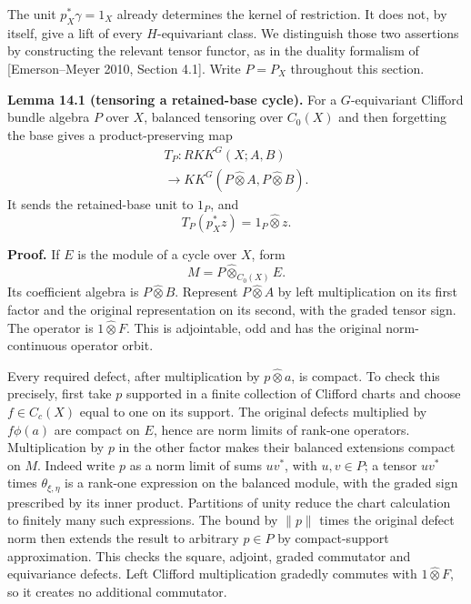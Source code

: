 \documentclass[
  11pt,
]{article}
\begin{document}
The unit \(p_X^*\gamma=1_X\) already determines the kernel of
restriction. It does not, by itself, give a lift of every
\(H\)-equivariant class. We distinguish those two assertions by
constructing the relevant tensor functor, as in the duality formalism of
{[}Emerson--Meyer 2010, Section 4.1{]}. Write \(P=P_X\) throughout this
section.

\textbf{Lemma 14.1 (tensoring a retained-base cycle).} For a
\(G\)-equivariant Clifford bundle algebra \(P\) over \(X\), balanced
tensoring over \(C_0(X)\) and then forgetting the base gives a
product-preserving map \[
\begin{gathered}
T_{P}:RKK^G(X;A,B)\\
\longrightarrow KK^G(P\widehat\otimes A,
                         P\widehat\otimes B).
\end{gathered}
\tag{14.1}
\] It sends the retained-base unit to \(1_{P}\), and \[
T_{P}(p_X^*z)=1_{P}\widehat\otimes z.
\tag{14.2}
\]

\textbf{Proof.} If \(E\) is the module of a cycle over \(X\), form \[
M=P\widehat\otimes_{C_0(X)}E.
\tag{14.3}
\] Its coefficient algebra is \(P\widehat\otimes B\). Represent
\(P\widehat\otimes A\) by left multiplication on its first factor and
the original representation on its second, with the graded tensor sign.
The operator is \(1\widehat\otimes F\). This is adjointable, odd and has
the original norm-continuous operator orbit.

Every required defect, after multiplication by \(p\widehat\otimes a\),
is compact. To check this precisely, first take \(p\) supported in a
finite collection of Clifford charts and choose \(f\in C_c(X)\) equal to
one on its support. The original defects multiplied by \(f\phi(a)\) are
compact on \(E\), hence are norm limits of rank-one operators.
Multiplication by \(p\) in the other factor makes their balanced
extensions compact on \(M\). Indeed write \(p\) as a norm limit of sums
\(uv^*\), with \(u,v\in P\); a tensor \(uv^*\) times
\(\theta_{\xi,\eta}\) is a rank-one expression on the balanced module,
with the graded sign prescribed by its inner product. Partitions of
unity reduce the chart calculation to finitely many such expressions.
The bound by \(\|p\|\) times the original defect norm then extends the
result to arbitrary \(p\in P\) by compact-support approximation. This
checks the square, adjoint, graded commutator and equivariance defects.
Left Clifford multiplication gradedly commutes with
\(1\widehat\otimes F\), so it creates no additional commutator.
\end{document}

